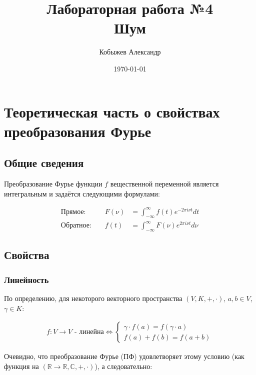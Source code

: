 \documentclass[a4paper,12pt]{report}
\title{Лабораторная работа №4\\Шум}
\author{Кобыжев Александр}
\date{\today}
\begin{document}
\maketitle
\tableofcontents
\listoffigures
\lstlistoflistings

\maketitle

\chapter{Теоретическая часть о свойствах преобразования Фурье}
\section{Общие сведения}

Преобразование Фурье функции $f$ вещественной переменной является интегральным и задаётся следующими формулами: 
    
\[
    \begin{aligned}
        \text{Прямое: } && F(\nu) &= \int_{-\infty}^{\infty} f(t) e^{-2\pi i\nu t} dt \\
        \text{Обратное: } && f(t) &=  \int_{-\infty}^{\infty} F(\nu) e^{2\pi i\nu t} d\nu
    \end{aligned}
\]

\section{Свойства}
\subsection{Линейность}
    
По определению, для некоторого векторного пространства $(V,K,+,\cdot)$, $a,b \in V$, $\gamma \in K$:

\[
    \begin{aligned}
        f: V \rightarrow V \text{ - линейна}
        \Longleftrightarrow
        \begin{cases}
                \gamma\cdot f(a) = f(\gamma\cdot a) \\
                f(a) + f(b) = f(a + b)
        \end{cases}
    \end{aligned}
\]
    
Очевидно, что преобразование Фурье (ПФ) удовлетворяет этому условию (как функция на $(\mathbb{R} \rightarrow \mathbb{R},\mathbb{C},+,\cdot)$), а следовательно:
\end{document}
